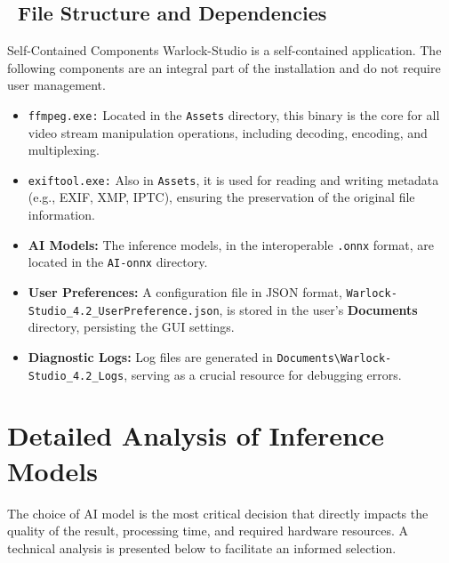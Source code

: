 \documentclass[11pt, a4paper]{article}
\newcommand{\SectionColor}{WarlockGray} %
\newcommand{\setsectioncolor}[1]{\renewcommand{\SectionColor}{#1}}
\newcommand{\inlinecode}[1]{\colorbox{WarlockLightGray}{\small\texttt{#1}}}
\begin{document}
\subsection{\faFolderOpen\ File Structure and Dependencies}
\begin{infobox}{Self-Contained Components}
Warlock-Studio is a self-contained application. The following components are an integral part of the installation and do not require user management.
\end{infobox}
\begin{itemize}[leftmargin=*]
    \item \inlinecode{ffmpeg.exe:} Located in the \texttt{Assets} directory, this binary is the core for all video stream manipulation operations, including decoding, encoding, and multiplexing.
    \item \inlinecode{exiftool.exe:} Also in \texttt{Assets}, it is used for reading and writing metadata (e.g., EXIF, XMP, IPTC), ensuring the preservation of the original file information.
    \item \textbf{AI Models:} The inference models, in the interoperable \texttt{.onnx} format, are located in the \texttt{AI-onnx} directory.
    \item \textbf{User Preferences:} A configuration file in JSON format, \texttt{Warlock-Studio\_4.2\_UserPreference.json}, is stored in the user's \textbf{Documents} directory, persisting the GUI settings.
    \item \textbf{Diagnostic Logs:} Log files are generated in \texttt{Documents\textbackslash Warlock-Studio\_4.2\_Logs}, serving as a crucial resource for debugging errors.
\end{itemize}

\setsectioncolor{ModelsColor}
\section{Detailed Analysis of Inference Models}
The choice of AI model is the most critical decision that directly impacts the quality of the result, processing time, and required hardware resources. A technical analysis is presented below to facilitate an informed selection.
\end{document}

